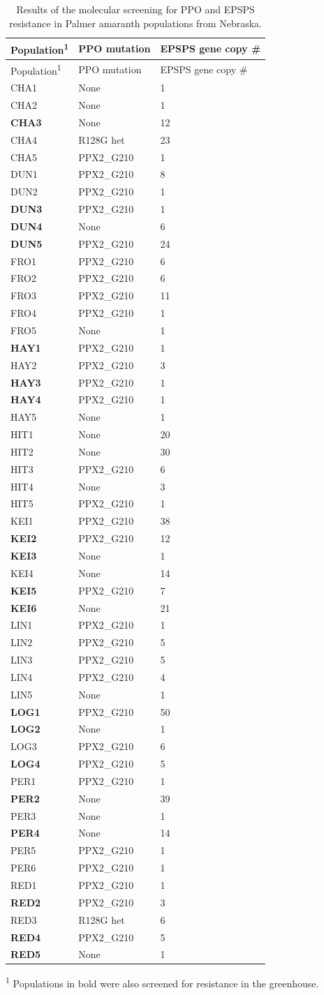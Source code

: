 \documentclass[]{article}
\begin{document}
\pagebreak

\begin{longtable}[]{@{}lll@{}}
\caption{Results of the molecular screening for PPO and EPSPS resistance
in Palmer amaranth populations from Nebraska.}\tabularnewline
\toprule
Population\textsuperscript{1} & PPO mutation & EPSPS gene copy
\#\tabularnewline
\midrule
\endfirsthead
\toprule
Population\textsuperscript{1} & PPO mutation & EPSPS gene copy
\#\tabularnewline
\midrule
\endhead
CHA1 & None & 1\tabularnewline
CHA2 & None & 1\tabularnewline
\textbf{CHA3} & None & 12\tabularnewline
CHA4 & R128G het & 23\tabularnewline
CHA5 & PPX2\_G210 & 1\tabularnewline
DUN1 & PPX2\_G210 & 8\tabularnewline
DUN2 & PPX2\_G210 & 1\tabularnewline
\textbf{DUN3} & PPX2\_G210 & 1\tabularnewline
\textbf{DUN4} & None & 6\tabularnewline
\textbf{DUN5} & PPX2\_G210 & 24\tabularnewline
FRO1 & PPX2\_G210 & 6\tabularnewline
FRO2 & PPX2\_G210 & 6\tabularnewline
FRO3 & PPX2\_G210 & 11\tabularnewline
FRO4 & PPX2\_G210 & 1\tabularnewline
FRO5 & None & 1\tabularnewline
\textbf{HAY1} & PPX2\_G210 & 1\tabularnewline
HAY2 & PPX2\_G210 & 3\tabularnewline
\textbf{HAY3} & PPX2\_G210 & 1\tabularnewline
\textbf{HAY4} & PPX2\_G210 & 1\tabularnewline
HAY5 & None & 1\tabularnewline
HIT1 & None & 20\tabularnewline
HIT2 & None & 30\tabularnewline
HIT3 & PPX2\_G210 & 6\tabularnewline
HIT4 & None & 3\tabularnewline
HIT5 & PPX2\_G210 & 1\tabularnewline
KEI1 & PPX2\_G210 & 38\tabularnewline
\textbf{KEI2} & PPX2\_G210 & 12\tabularnewline
\textbf{KEI3} & None & 1\tabularnewline
KEI4 & None & 14\tabularnewline
\textbf{KEI5} & PPX2\_G210 & 7\tabularnewline
\textbf{KEI6} & None & 21\tabularnewline
LIN1 & PPX2\_G210 & 1\tabularnewline
LIN2 & PPX2\_G210 & 5\tabularnewline
LIN3 & PPX2\_G210 & 5\tabularnewline
LIN4 & PPX2\_G210 & 4\tabularnewline
LIN5 & None & 1\tabularnewline
\textbf{LOG1} & PPX2\_G210 & 50\tabularnewline
\textbf{LOG2} & None & 1\tabularnewline
LOG3 & PPX2\_G210 & 6\tabularnewline
\textbf{LOG4} & PPX2\_G210 & 5\tabularnewline
PER1 & PPX2\_G210 & 1\tabularnewline
\textbf{PER2} & None & 39\tabularnewline
PER3 & None & 1\tabularnewline
\textbf{PER4} & None & 14\tabularnewline
PER5 & PPX2\_G210 & 1\tabularnewline
PER6 & PPX2\_G210 & 1\tabularnewline
RED1 & PPX2\_G210 & 1\tabularnewline
\textbf{RED2} & PPX2\_G210 & 3\tabularnewline
RED3 & R128G het & 6\tabularnewline
\textbf{RED4} & PPX2\_G210 & 5\tabularnewline
\textbf{RED5} & None & 1\tabularnewline
\bottomrule
\end{longtable}

\textsuperscript{1} Populations in bold were also screened for
resistance in the greenhouse.
\end{document}
